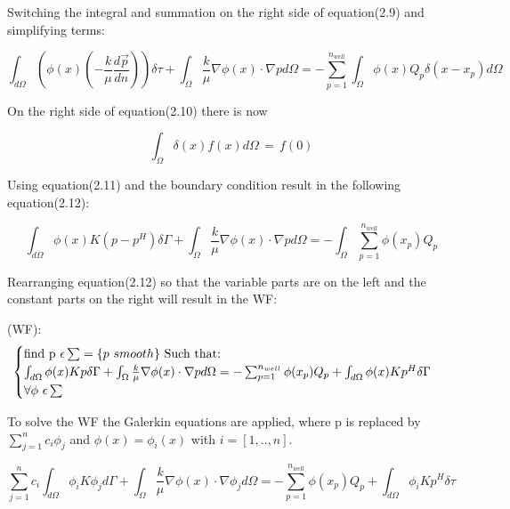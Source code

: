 \documentclass[a4paper]{report}
\begin{document}
Switching the integral and summation on the right side of equation(2.9) and simplifying terms:

\begin{equation}
	\int_{d\Omega}(\phi(x)(-\frac{k}{\mu}\frac{d\vec{p}}{dn}))\delta\tau+\int_{\Omega}\frac{k}{\mu}\nabla\phi(x)\cdot\nabla p d\Omega= -\sum_{p=1}^{n_{well}}\int_{\Omega}\phi(x) Q_p\delta(x-x_p)d\Omega
\end{equation}


On the right side of equation(2.10) there is now 

\begin{equation}
	\int_{\Omega}\delta(x)f(x)d\Omega \, = \, f(0)	
\end{equation}

Using equation(2.11) and the boundary condition result in the following equation(2.12):

\begin{equation}
	\int_{d\Omega}\phi(x)K(p-p^H)\delta\Gamma+\int_{\Omega}\frac{k}{\mu}\nabla\phi(x)\cdot\nabla p d\Omega= -\int_{\Omega}\sum_{p=1}^{n_{well}}\phi(x_p) Q_p
\end{equation}	

Rearranging equation(2.12) so that the variable parts are on the left and the constant parts on the right will result in the WF: \vspace{5mm}


(WF): \begin{equation}
		\begin{cases} 
			$find p $\epsilon \sum =\{p$ $ smooth\}$ Such that:$ \\
			\int_{d\Omega}\phi(x)Kp\delta\Gamma+\int_{\Omega}\frac{k}{\mu}\nabla\phi(x)\cdot\nabla p d\Omega= -\sum_{p=1}^{n_{well}}\phi(x_p) Q_p +\int_{d\Omega}\phi(x)Kp^H\delta\Gamma\\ \forall\phi $ $ \epsilon\sum 
		\end{cases}\  
	\end{equation}

To solve the WF the Galerkin equations are applied, where p is replaced by $ \sum_{j=1}^{n}c_i\phi_j $ and  $\phi(x)=\phi_i(x)$ with $i = [1,..,n]$.

\begin{equation}
	\sum_{j=1}^{n}c_i\int_{d\Omega}\phi_i K\phi_j d\Gamma + \int_{\Omega}\frac{k}{\mu}\nabla\phi(x)\cdot\nabla \phi_j d\Omega= -\sum_{p=1}^{n_{well}}\phi(x_p) Q_p +\int_{d\Omega}\phi_i Kp^H\delta\tau
\end{equation}
\end{document}
